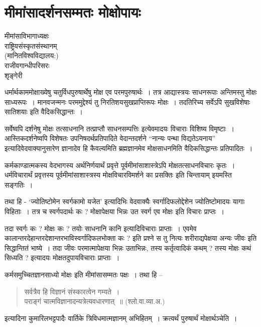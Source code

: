 {\fontsize{15}{17}\selectfont
\chapter{मीमांसादर्शनसम्मतः मोक्षोपायः}

\begin{center}
\smallskip

मीमांसाविभागाध्यक्षः\\
राष्ट्रियसंस्कृतसंस्थानम् \\
(मानितविश्वविद्यालय:)\\
राजीवगान्धीपरिसरः\\
शृङ्गेरी
\addrule
\end{center}
धर्मार्थकाममोक्षाख्येषु चतुर्विधपुरुषार्थेषु मोक्ष एव परमपुरुषार्थः~। तत्र आद्यास्त्रयः साधनरूपाः अन्तिमस्तु मोक्षः साध्यरूपः~। मानवजन्मनः परममुद्देश्यं तु निरतिशयसुखप्राप्तिरूपः मोक्षः~। तदतिरिच्य सर्वेऽपि सुखविशेषाः सातिशयाः इति वैदिकसिद्धान्तः~। 

सर्वेष्वपि दर्शनेषु मोक्षः तत्साधनानि तत्प्राप्तौ साधनसम्पत्तिः इत्येवमादयः विचाराः विशिष्य विमृष्टाः~। आस्तिकदर्शनेष्वपि विशेषतः उपनिषदर्थप्रतिपादिते वेदान्तदर्शने “नान्यः पन्था विद्यतेऽयनाय” इत्यादिवेदवाक्यानुसारेण ज्ञानादेव हि कैवल्यमिति ब्रह्मज्ञानमेव मोक्षसाधनमिति वैदिकसिद्धान्तः प्रतिपादितः~। 

कर्मकाण्डात्मकस्य वेदभागस्य अर्थनिर्णयार्थं प्रवृत्ते पूर्वमीमांसाशास्त्रेऽपि मोक्षतत्साधनविचारः कृतः~। धर्मविचारार्थं प्रवृत्तस्य पूर्वमीमांसाशास्त्रस्य मोक्षविचारविमर्शने का प्रसक्तिः इति चिन्तायाम् इयमस्ति सङ्गतिः~। 

तथा हि - ‘ज्योतिष्टोमेन स्वर्गकामो यजेत’ इत्यादिभिः वेदवाक्यैः स्वर्गादिफलोद्देशेन ज्योतिष्टोमादयः यागाः विहिताः~। तत्र च स्वर्गपदार्थः कः ? मोक्षापेक्षया भिन्नः उत स्वर्ग एव मोक्षः इति विचारः प्राप्तः~। 

तदा स्वर्गः कः ? मोक्षः कः ? तयोः साधनानि कानि इत्यादिविचाराः प्राप्ताः~। एवमेव कालान्तरदेहान्तरदेशान्तरभाविस्वर्गादिफलभोक्ता कः ? इति प्रश्ने स तु नित्यः शरीराद्यपेक्षया अन्यः जीवः इति सिद्धान्तितं भाष्ये~। तदा जीवः परमात्मापेक्षया भिन्नः उताभिन्नः, तस्य कर्तृत्वादिकं कथम् ? तस्य मोक्षः कथं सिध्यति ? इत्यादयः मोक्षतदुपायविचाराः प्राप्ताः~। 

कर्मसमुच्चितज्ञानसाध्यो मोक्षः इति मीमांसासम्मतः पक्षः~। तथा हि –
\begin{verse}
सर्वत्रैव हि विज्ञानं संस्कारत्वेन गम्यते~। \\
पराङ्गं चात्मविज्ञानादन्यत्रेत्यवधारणात्~॥ (श्लो.वा.व्या.अ.)
\end{verse}
इत्यादिना कुमारिलभट्टपादैः वार्तिके त्रिविधमात्मज्ञानम् अभिहितम्~। क्रत्वर्थं पुरुषार्थं मोक्षार्थञ्चेति~। 

}
